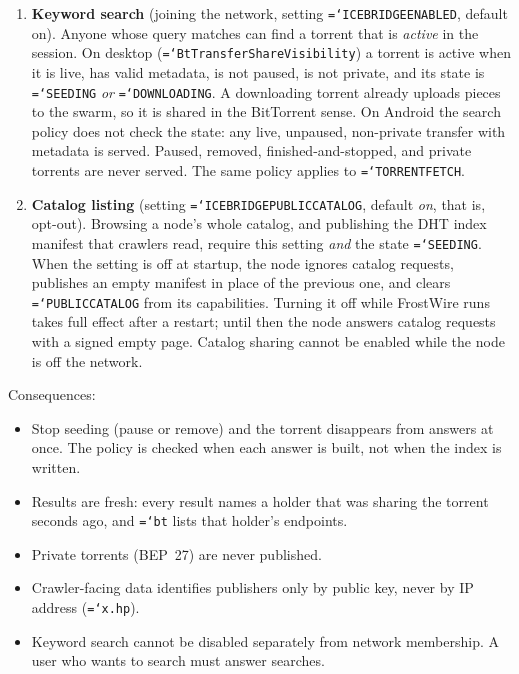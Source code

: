\documentclass[11pt,a4paper]{article}
\newcommand{\code}[1]{\texttt{\hyphenchar\font=`\-\relax #1}}
\DeclareRobustCommand{\_}{\origunderscore\allowbreak}
\begin{document}
\begin{enumerate}
\item \textbf{Keyword search} (joining the network, setting \code{ICEBRIDGE\_ENABLED},
  default on). Anyone whose query matches can find a torrent that is \emph{active} in the
  session. On desktop (\code{BtTransferShareVisibility}) a torrent is active when it is
  live, has valid metadata, is not paused, is not private, and its state is \code{SEEDING}
  \emph{or} \code{DOWNLOADING}. A downloading torrent already uploads pieces to the swarm, so
  it is shared in the BitTorrent sense. On Android the search policy does not check the
  state: any live, unpaused, non-private transfer with metadata is served. Paused, removed,
  finished-and-stopped, and private torrents are never served. The same policy applies to
  \code{TORRENT\_FETCH}.
\item \textbf{Catalog listing} (setting \code{ICEBRIDGE\_PUBLIC\_CATALOG}, default
  \emph{on}, that is, opt-out). Browsing a node's whole catalog, and publishing the DHT index
  manifest that crawlers read, require this setting \emph{and} the state \code{SEEDING}. When
  the setting is off at startup, the node ignores catalog requests, publishes an empty
  manifest in place of the previous one, and clears \code{PUBLIC\_CATALOG} from its
  capabilities. Turning it off while FrostWire runs takes full effect after a restart; until
  then the node answers catalog requests with a signed empty page. Catalog
  sharing cannot be enabled while the node is off the network.
\end{enumerate}

Consequences:
\begin{itemize}
\item Stop seeding (pause or remove) and the torrent disappears from answers at once. The
  policy is checked when each answer is built, not when the index is written.
\item Results are fresh: every result names a holder that was sharing the torrent seconds
  ago, and \code{bt} lists that holder's endpoints.
\item Private torrents (BEP~27) are never published.
\item Crawler-facing data identifies publishers only by public key, never by IP address
  (\code{x.hp}).
\item Keyword search cannot be disabled separately from network membership. A user who wants
  to search must answer searches.
\end{itemize}
\end{document}
